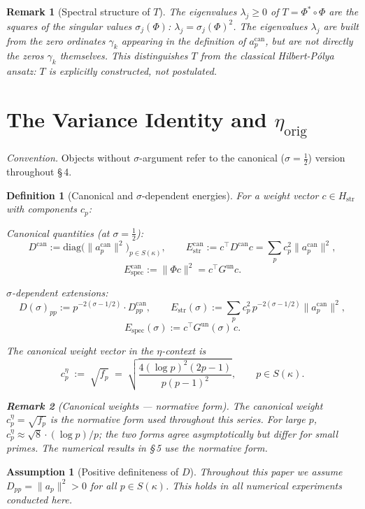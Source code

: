 \documentclass[11pt]{article}
\newtheorem{definition}[theorem]{Definition}
\newtheorem{assumption}[theorem]{Assumption}
\newtheorem*{remark}{Remark}
\newcommand{\Hstr}{H_{\mathrm{str}}}
\newcommand{\Estr}{E_{\mathrm{str}}}
\newcommand{\Espec}{E_{\mathrm{spec}}}
\newcommand{\etaorig}{\eta_{\mathrm{orig}}}
\newcommand{\Gun}{G^{\mathrm{un}}}
\newcommand{\acan}{a_p^{\mathrm{can}}}
\newcommand{\Dcan}{D^{\mathrm{can}}}
\newcommand{\Estrcan}{\Estr^{\mathrm{can}}}
\newcommand{\Especcan}{\Espec^{\mathrm{can}}}
\newcommand{\ceta}{c_p^{\eta}}
\newcommand{\fp}{f_p}
\begin{document}
\begin{remark}[Spectral structure of $T$]
The eigenvalues $\lambda_j\geq 0$ of $T=\Phi^*\circ\Phi$ are the squares of
the singular values $\sigma_j(\Phi)$: $\lambda_j=\sigma_j(\Phi)^2$.
The eigenvalues $\lambda_j$ are built from the zero ordinates $\gamma_k$
appearing in the definition of $\acan$, but are \emph{not} directly the zeros
$\gamma_k$ themselves. This distinguishes $T$ from the classical Hilbert-P\'olya
ansatz: $T$ is explicitly constructed, not postulated.
\end{remark}

\section{The Variance Identity and $\etaorig$}

\emph{Convention.} Objects without $\sigma$-argument refer to the canonical
($\sigma=\tfrac12$) version throughout \S\,4.

\begin{definition}[Canonical and $\sigma$-dependent energies]
\label{def:energies}
For a weight vector $c\in\Hstr$ with components $c_p$:

\emph{Canonical quantities} (at $\sigma=\tfrac12$):
\[
\Dcan:=\mathrm{diag}\!\bigl(\|\acan\|^2\bigr)_{p\in S(\kappa)},
\qquad
\Estrcan:=c^\top\Dcan c=\sum_p c_p^2\|\acan\|^2,
\]
\[
\Especcan:=\|\Phi c\|^2=c^\top\Gun c.
\]

\emph{$\sigma$-dependent extensions:}
\[
D(\sigma)_{pp}:=p^{-2(\sigma-1/2)}\cdot\Dcan_{pp},
\qquad
\Estr(\sigma):=\sum_p c_p^2\,p^{-2(\sigma-1/2)}\|\acan\|^2,
\]
\[
\Espec(\sigma):=c^\top\Gun(\sigma)\,c.
\]

The \emph{canonical weight vector} in the $\eta$-context is
\[
\ceta \;:=\; \sqrt{\fp}
    \;=\; \sqrt{\frac{4(\log p)^2(2p-1)}{p(p-1)^2}},
    \qquad p \in S(\kappa).
\]
\begin{remark}[Canonical weights --- normative form]
The canonical weight $\ceta = \sqrt{\fp}$
is the normative form used throughout this series. For large $p$,
$\ceta \approx \sqrt{8}\cdot(\log p)/p$; the two forms
agree asymptotically but differ for small primes.
The numerical results in \S\,5 use the normative form.
\end{remark}
\end{definition}

\begin{assumption}[Positive definiteness of $D$]
Throughout this paper we assume $D_{pp}=\|a_p\|^2>0$ for all
$p\in S(\kappa)$. This holds in all numerical experiments conducted here.
\end{assumption}
\end{document}

